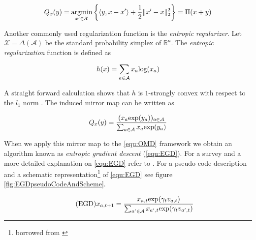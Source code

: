 \begin{equation*}
    Q_x(y) = \operatorname*{\arg\!\min}_{x'\in \mathcal{X}}\bigg\{\langle y,x-x'\rangle + \frac{1}{2}\|x'-x\|_2^2\bigg\} = \Pi(x + y)
\end{equation*}

Another commonly used regularization function is the \textit{entropic regularizer}. Let $\mathcal{X} = \Delta(\mathcal{A})$ be the standard probability simplex of $\mathbb{R}^n$. The \textit{entropic regularization} function is defined as

\begin{equation*}
    h(x) = \sum_{a\in\mathcal{A}}x_a\textnormal{log}(x_a)
\end{equation*}

A straight forward calculation shows that $h$ is $1$-strongly convex with respect to the $l_1$ norm \cite{HDRmertikopoulos}. The induced mirror map can be written as

\begin{equation*}
    Q_x(y) = \frac{(x_a\textnormal{exp}(y_a))_{a\in\mathcal{A}}}{\sum_{a\in\mathcal{A}}x_a\textnormal{exp}(y_a)}
\end{equation*}

When we apply this mirror map to the \ref{equ:OMD} framework we obtain an algorithm known as \textit{entropic gradient descent} (\ref{equ:EGD}). For a survey and a more detailed explanation on \ref{equ:EGD} refer to \cite{shalev}. For a pseudo code description and a schematic representation\footnote{borrowed from \cite[Chapter 2]{HDRmertikopoulos}} of \ref{equ:EGD} see figure \ref{fig:EGDpseudoCodeAndScheme}.

\begin{equation}
    \tag{EGD}
    x_{a,t+1} = \frac{x_{a,t}\textnormal{exp}(\gamma_t v_{a,t})}{\sum_{a'\in\mathcal{A}}x_{a',t}\textnormal{exp}(\gamma_t v_{a',t})}
    \label{equ:EGD}
\end{equation}


